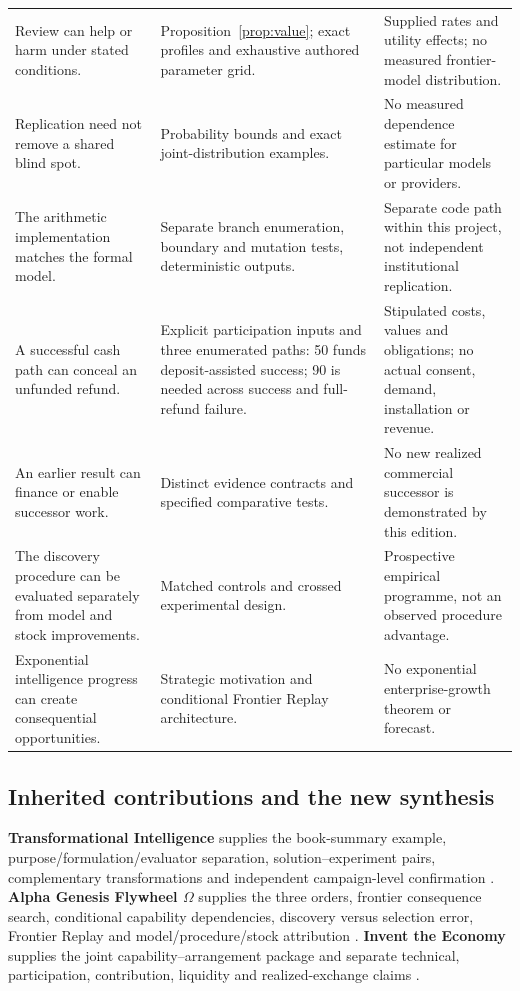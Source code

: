 \begin{longtable}{P{1.55in}P{2.32in}P{2.05in}}
Review can help or harm under stated conditions. & Proposition~\ref{prop:value}; exact profiles and exhaustive authored parameter grid. & Supplied rates and utility effects; no measured frontier-model distribution.\\
Replication need not remove a shared blind spot. & Probability bounds and exact joint-distribution examples. & No measured dependence estimate for particular models or providers.\\
The arithmetic implementation matches the formal model. & Separate branch enumeration, boundary and mutation tests, deterministic outputs. & Separate code path within this project, not independent institutional replication.\\
A successful cash path can conceal an unfunded refund. & Explicit participation inputs and three enumerated paths: 50 funds deposit-assisted success; 90 is needed across success and full-refund failure. & Stipulated costs, values and obligations; no actual consent, demand, installation or revenue.\\
An earlier result can finance or enable successor work. & Distinct evidence contracts and specified comparative tests. & No new realized commercial successor is demonstrated by this edition.\\
The discovery procedure can be evaluated separately from model and stock improvements. & Matched controls and crossed experimental design. & Prospective empirical programme, not an observed procedure advantage.\\
Exponential intelligence progress can create consequential opportunities. & Strategic motivation and conditional Frontier Replay architecture. & No exponential enterprise-growth theorem or forecast.\\
\bottomrule
\end{longtable}

\subsection{Inherited contributions and the new synthesis}
\textbf{Transformational Intelligence} supplies the book-summary example, purpose/formulation/evaluator separation, solution--experiment pairs, complementary transformations and independent campaign-level confirmation \citep[\S1--2, \S5, \S7--8 and Appendix C]{boucher_ti}. \textbf{Alpha Genesis Flywheel $\Omega$} supplies the three orders, frontier consequence search, conditional capability dependencies, discovery versus selection error, Frontier Replay and model/procedure/stock attribution \citep[\S3--7 and \S12]{boucher_genesis}. \textbf{Invent the Economy} supplies the joint capability--arrangement package and separate technical, participation, contribution, liquidity and realized-exchange claims \citep[\S2--7 and \S11--12]{boucher_economy}.

